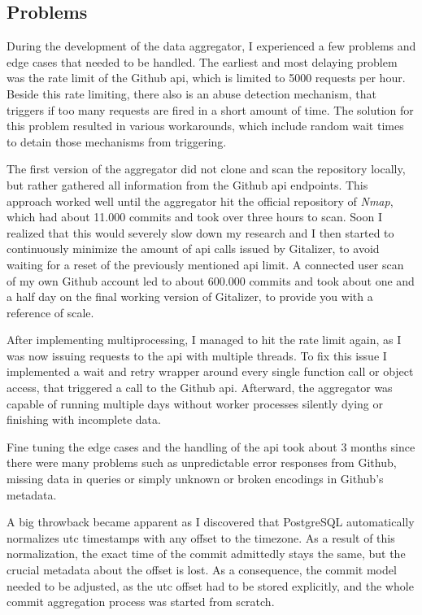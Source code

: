 \subsection{Problems}
During the development of the data aggregator, I experienced a few problems and edge cases that needed to be handled.
The earliest and most delaying problem was the rate limit of the Github \ac{api}, which is limited to 5000 requests per hour.
Beside this rate limiting, there also is an abuse detection mechanism, that triggers if too many requests are fired in a short amount of time.
The solution for this problem resulted in various workarounds, which include random wait times to detain those mechanisms from triggering.

The first version of the aggregator did not clone and scan the repository locally, but rather gathered all information from the Github \ac{api} endpoints.
This approach worked well until the aggregator hit the official repository of \emph{Nmap}, which had about 11.000 commits and took over three hours to scan.
Soon I realized that this would severely slow down my research and I then started to continuously minimize the amount of \ac{api} calls issued by Gitalizer, to avoid waiting for a reset of the previously mentioned \ac{api} limit.
A connected user scan of my own Github account led to about 600.000 commits and took about one and a half day on the final working version of Gitalizer, to provide you with a reference of scale.

After implementing multiprocessing, I managed to hit the rate limit again, as I was now issuing requests to the \ac{api} with multiple threads.
To fix this issue I implemented a wait and retry wrapper around every single function call or object access, that triggered a call to the Github \ac{api}.
Afterward, the aggregator was capable of running multiple days without worker processes silently dying or finishing with incomplete data.

Fine tuning the edge cases and the handling of the \ac{api} took about 3 months since there were many problems such as unpredictable error responses from Github, missing data in queries or simply unknown or broken encodings in Github's metadata.

A big throwback became apparent as I discovered that PostgreSQL automatically normalizes \ac{utc} timestamps with any offset to the  timezone.
As a result of this normalization, the exact time of the commit admittedly stays the same, but the crucial metadata about the offset is lost.
As a consequence, the commit model needed to be adjusted, as the \ac{utc} offset had to be stored explicitly, and the whole commit aggregation process was started from scratch.

